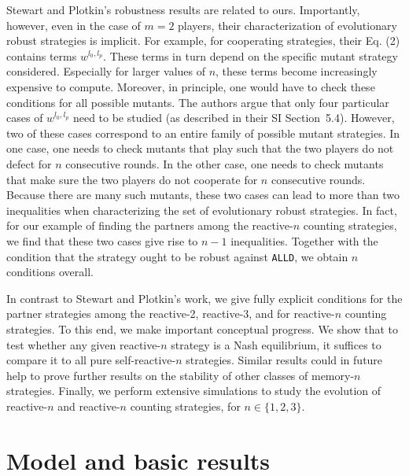 \documentclass[9pt,twoside,lineno]{pnas-new}
\theoremstyle{plainCl1}
\theoremstyle{plainCl2}
\def\alld{\texttt{ALLD}}
\begin{document}
Stewart and Plotkin's robustness results are related to ours. 
Importantly,  however, even in the case of $m\!=\!2$ players, their characterization of evolutionary robust strategies is implicit.  
For example, for cooperating strategies, their Eq. (2) contains terms $w^{l_0,l_p}$. 
These terms in turn depend on the specific mutant strategy considered. 
Especially for larger values of $n$, these terms become increasingly expensive to compute. 
Moreover, in principle, one would have to check these conditions for all possible mutants. 
The authors argue that only four particular cases of  $w^{l_0,l_p}$ need to be studied (as described in their SI Section~5.4).
However, two of these cases correspond to an entire family of possible mutant strategies. 
In one case, one needs to check mutants that play such that the two players do not defect for $n$ consecutive rounds.  
In the other case, one needs to check mutants that make sure the two players do not cooperate for $n$ consecutive rounds. 
Because there are many such mutants, these two cases can lead to more than two inequalities when characterizing the set of evolutionary robust strategies. 
In fact, for our example of finding the partners among the reactive-$n$ counting strategies, we find that these two cases give rise to $n\!-\!1$ inequalities. 
Together with the condition that the strategy ought to be robust against \alld, we obtain $n$ conditions overall. 

In contrast to Stewart and Plotkin's work, we give fully explicit conditions for the partner strategies among the reactive-2, reactive-3, and for reactive-$n$ counting strategies. 
To this end, we make important conceptual progress. 
We show that to test whether any given reactive-$n$ strategy is a Nash equilibrium, it suffices to compare it to all pure self-reactive-$n$ strategies. 
Similar results could in future help to prove further results on the stability of other classes of memory-$n$ strategies.  
Finally, we perform extensive simulations to study the evolution of reactive-$n$ and reactive-$n$ counting strategies, for $n\!\in\!\{1,2,3\}$. 




\clearpage
\newpage




\section{Model and basic results}\label{section:model}
\end{document}
